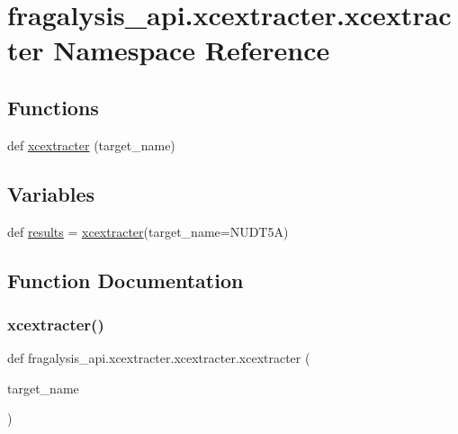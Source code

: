\hypertarget{namespacefragalysis__api_1_1xcextracter_1_1xcextracter}{}\section{fragalysis\+\_\+api.\+xcextracter.\+xcextracter Namespace Reference}
\label{namespacefragalysis__api_1_1xcextracter_1_1xcextracter}
\subsection*{Functions}
\begin{DoxyCompactItemize}
\item 
def \hyperlink{namespacefragalysis__api_1_1xcextracter_1_1xcextracter_a9aad6a3badcb479c966f153ce6b87126}{xcextracter} (target\+\_\+name)
\end{DoxyCompactItemize}
\subsection*{Variables}
\begin{DoxyCompactItemize}
\item 
def \hyperlink{namespacefragalysis__api_1_1xcextracter_1_1xcextracter_a72e0abb30ca031f003e991a2d76b1040}{results} = \hyperlink{namespacefragalysis__api_1_1xcextracter_1_1xcextracter_a9aad6a3badcb479c966f153ce6b87126}{xcextracter}(target\+\_\+name=\textquotesingle{}N\+U\+D\+T5A\textquotesingle{})
\end{DoxyCompactItemize}


\subsection{Function Documentation}
\mbox{\label{namespacefragalysis__api_1_1xcextracter_1_1xcextracter_a9aad6a3badcb479c966f153ce6b87126}} 
\subsubsection{\texorpdfstring{xcextracter()}{xcextracter()}}
{\footnotesize\ttfamily def fragalysis\+\_\+api.\+xcextracter.\+xcextracter.\+xcextracter (\begin{DoxyParamCaption}\item[{}]{target\+\_\+name }\end{DoxyParamCaption})}



